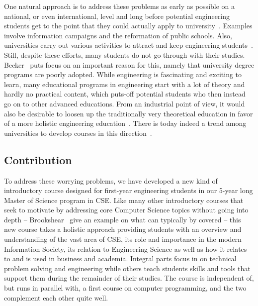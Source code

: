\documentclass[conference]{IEEEtran}
\begin{document}
One natural approach is to address these problems as early as possible on a national, or even international, level and long before potential engineering students get to the point that they could actually apply to university~\cite{ert,act2004}. Examples involve information campaigns and the reformation of public schools. Also, universities carry out various activities to attract and keep engineering students~\cite{5872032,hk-atsfyshe-12,dkh-asees-sp-2011}. Still, despite these efforts, many students do not go through with their studies. Becker~\cite{b-wdypwbe-rrdd-2010} puts focus on an important reason for this, namely that university degree programs are poorly adopted. 
While engineering is fascinating and exciting to learn, many educational programs in engineering start with a lot of theory and hardly no practical content, which puts-off potential students who then instead go on to other advanced educations. From an industrial point of view, it would also be desirable to loosen up the traditionally very theoretical education in favor of a more holistic engineering education~\cite{rh-tcet-2012}. There is today indeed a trend among universities to develop courses in this direction~\cite{gcj-riecr-11,tnmgk-ifecir-08,4760346,10.1109/FIE.2012.6462284}. 

\subsection{Contribution}

To address these worrying problems, we have developed a new kind of introductory course designed for first-year engineering students in our 5-year long Master of Science program in CSE. Like many other introductory courses that seek to motivate by addressing core Computer Science topics without going into depth -- Brookshear~\cite{brookshear2011computer} give an example on what can typically by covered -- this new course takes a holistic approach providing students with an overview and understanding of the vast area of CSE, its role and importance in the modern Information Society, its relation to Engineering Science as well as how it relates to and is used in business and academia. Integral parts focus in on technical problem solving and engineering while others teach students skills and tools that support them during the remainder of their studies. The course is independent of, but runs in parallel with, a first course on computer programming, and the two complement each other quite well.
\end{document}
